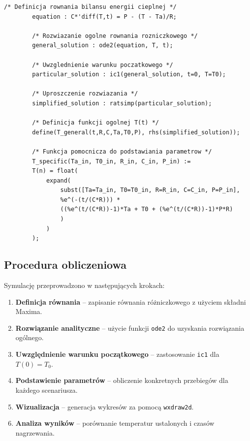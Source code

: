 \documentclass[a4paper,12pt]{article}
\begin{document}
	\begin{lstlisting}[caption={Rozwiązanie analityczne równania bilansu cieplnego w Maxima}]
		/* Definicja rownania bilansu energii cieplnej */
		equation : C*'diff(T,t) = P - (T - Ta)/R;
		
		/* Rozwiazanie ogolne rownania rozniczkowego */
		general_solution : ode2(equation, T, t);
		
		/* Uwzglednienie warunku poczatkowego */
		particular_solution : ic1(general_solution, t=0, T=T0);
		
		/* Uproszczenie rozwiazania */
		simplified_solution : ratsimp(particular_solution);
		
		/* Definicja funkcji ogolnej T(t) */
		define(T_general(t,R,C,Ta,T0,P), rhs(simplified_solution));
		
		/* Funkcja pomocnicza do podstawiania parametrow */
		T_specific(Ta_in, T0_in, R_in, C_in, P_in) :=
		T(n) = float(
			expand(
				subst([Ta=Ta_in, T0=T0_in, R=R_in, C=C_in, P=P_in],
				%e^(-(t/(C*R))) *
				((%e^(t/(C*R))-1)*Ta + T0 + (%e^(t/(C*R))-1)*P*R)
				)
			)
		);
	\end{lstlisting}
	
	
	
	\vspace{-0.3cm}
	\subsection{Procedura obliczeniowa}
	
	Symulację przeprowadzono w następujących krokach:
	
	\begin{enumerate}
		\item \textbf{Definicja równania} – zapisanie równania różniczkowego z użyciem składni Maxima.
		\item \textbf{Rozwiązanie analityczne} – użycie funkcji \texttt{ode2} do uzyskania rozwiązania ogólnego.
		\item \textbf{Uwzględnienie warunku początkowego} – zastosowanie \texttt{ic1} dla $T(0) = T_0$.
		\item \textbf{Podstawienie parametrów} – obliczenie konkretnych przebiegów dla każdego scenariusza.
		\item \textbf{Wizualizacja} – generacja wykresów za pomocą \texttt{wxdraw2d}.
		\item \textbf{Analiza wyników} – porównanie temperatur ustalonych i czasów nagrzewania.
	\end{enumerate}
	
\end{document}
